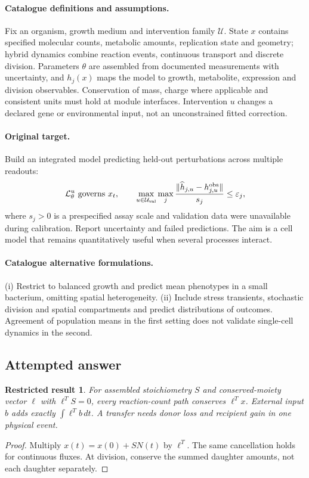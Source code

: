 \documentclass[11pt]{article}
\newtheorem{attemptresult}{Restricted result}[section]
\begin{document}
\paragraph{Catalogue definitions and assumptions.}
Fix an organism, growth medium and intervention family $\mathcal U$. State $x$ contains specified molecular counts, metabolic amounts, replication state and geometry; hybrid dynamics combine reaction events, continuous transport and discrete division. Parameters $\theta$ are assembled from documented measurements with uncertainty, and $h_j(x)$ maps the model to growth, metabolite, expression and division observables. Conservation of mass, charge where applicable and consistent units must hold at module interfaces. Intervention $u$ changes a declared gene or environmental input, not an unconstrained fitted correction.
\paragraph{Original target.}
Build an integrated model predicting held-out perturbations across multiple readouts:
\[
\mathcal L_\theta^u\text{ governs }x_t,
\qquad \max_{u\in\mathcal U_{\rm val}}\max_j
\frac{\|\widehat h_{j,u}-h_{j,u}^{\rm obs}\|}{s_j}\leq\varepsilon_j,
\]
where $s_j>0$ is a prespecified assay scale and validation data were unavailable during calibration. Report uncertainty and failed predictions. The aim is a cell model that remains quantitatively useful when several processes interact.
\paragraph{Catalogue alternative formulations.}
(i) Restrict to balanced growth and predict mean phenotypes in a small bacterium, omitting spatial heterogeneity. (ii) Include stress transients, stochastic division and spatial compartments and predict distributions of outcomes. Agreement of population means in the first setting does not validate single-cell dynamics in the second.
\subsection{Attempted answer}
\begin{attemptresult}
For assembled stoichiometry $S$ and conserved-moiety vector $\ell$ with $\ell^TS=0$, every reaction-count path conserves $\ell^Tx$. External input $b$ adds exactly $\int\ell^Tb\,dt$. A transfer needs donor loss and recipient gain in one physical event.
\end{attemptresult}
\begin{proof}
Multiply $x(t)=x(0)+SN(t)$ by $\ell^T$. The same cancellation holds for continuous fluxes. At division, conserve the summed daughter amounts, not each daughter separately.
\end{proof}
\end{document}

